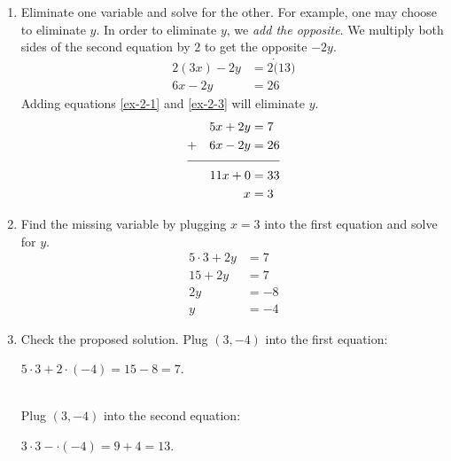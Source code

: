 \begin{multicols}{2}
		\begin{solution}\mbox{}
			\begin{enumerate}[label={\textbf{\textup{Step \arabic*.}}~}]
				\item Eliminate one variable and solve for the other. For example, one may choose to eliminate $y$.
				      In order to eliminate $y$, we \emph{add the opposite}. We multiply both sides of the second equation by $2$ to get the opposite $-2y$.
				      \begin{align}
					      2(3x) - 2y & =2\dot(13) \nonumber \\
					      6x - 2y    & = 26  \label{ex-2-3}
				      \end{align}
				      Adding equations \eqref{ex-2-1} and \eqref{ex-2-3} will eliminate $y$.
				      \begin{align}
					        &  & 5x + 2y & = 7 \nonumber   \\
					      + &  & 6x -2y  & = 26  \nonumber \\[-0.5em]
					      \cline{1-4}
					        &  & 11x+0   & =33\nonumber    \\
					        &  & x       & =3\nonumber
				      \end{align}

				\item Find the missing variable by plugging $x=3$ into the first equation and solve for $y$.
				      \begin{align*}
					      5\cdot 3+ 2y & =7  \\
					      15+2y        & = 7 \\
					      2y           & =-8 \\
					      y            & =-4
				      \end{align*}


				\item Check the proposed solution.
				      Plug $(3, -4)$ into the first equation:\\ \centerline{$5\cdot 3+2\cdot(-4)=15-8=7$.}\\
				      Plug $(3, -4)$ into the second equation:\\ \centerline{$3\cdot 3-\cdot(-4)=9+4=13$.}
			\end{enumerate}
		\end{solution}

	\end{multicols}

